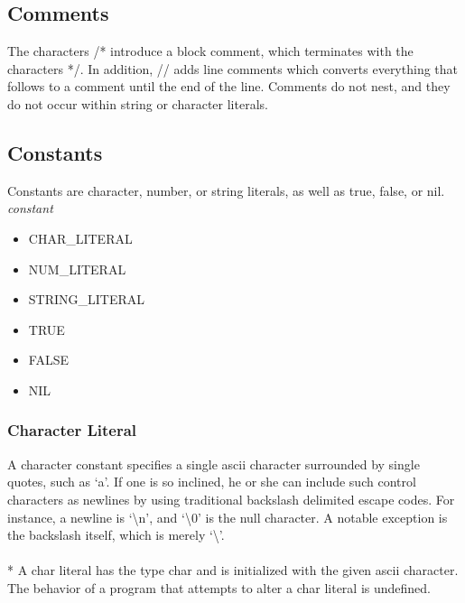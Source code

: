 \subsection{Comments}
The characters /* introduce a block comment, which terminates with the characters */. In addition, // adds line comments which converts everything that follows to a comment until the end of the line. Comments do not nest, and they do not occur within string or character literals.
\subsection{Constants}
Constants are character, number, or string literals, as well as true, false, or nil.
\\ \emph{constant}
\begin{itemize}
\item
CHAR\_LITERAL
\item
NUM\_LITERAL
\item
STRING\_LITERAL
\item
TRUE
\item
FALSE
\item
NIL
\end{itemize}
\subsubsection{Character Literal}
A character constant specifies a single ascii character surrounded by single quotes, such as `a'. If one is so inclined, he or she can include such control characters as newlines by using traditional backslash delimited escape codes. For instance, a newline is `\textbackslash n', and `\textbackslash 0' is the null character. A notable exception is the backslash itself, which is merely `\textbackslash'.
\\ \\* A char literal has the type char and is initialized with the given ascii character. The behavior of a program that attempts to alter a char literal is undefined.
